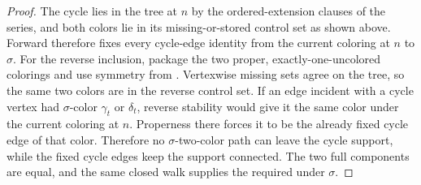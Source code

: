 \begin{proof}
The cycle lies in the tree at \(n\) by the ordered-extension clauses of
the series, and both colors lie in its missing-or-stored control set as
shown above.  Forward  therefore fixes every
cycle-edge identity from the current coloring at \(n\) to \(\sigma\).
For the reverse inclusion, package the two proper,
exactly-one-uncolored colorings and use symmetry from .
Vertexwise missing sets agree on the tree, so the same two colors are in
the reverse control set.  If an edge incident with a cycle vertex had
\(\sigma\)-color \(\gamma_t\) or \(\delta_t\), reverse stability would
give it the same color under the current coloring at \(n\).  Properness
there forces it to be the already fixed cycle edge of that color.
Therefore no \(\sigma\)-two-color path can leave the cycle support, while
the fixed cycle edges keep the support connected.  The two full
components are equal, and the same closed walk supplies the required
 under \(\sigma\).
\end{proof}
